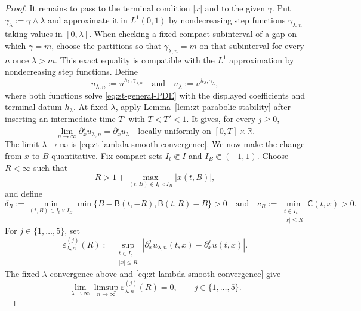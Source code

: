 \documentclass[10pt]{amsart}
\theoremstyle{definition}
\theoremstyle{remark}
\numberwithin{equation}{section}
\newcommand{\R}{\mathbb R}
\newcommand{\1}{\mathbf 1}
\begin{document}
\begin{proof}
It remains to pass to the terminal condition $|x|$ and to the given $\gamma$. Put $\gamma_\lambda:=\gamma\wedge\lambda$ and approximate it in $L^1(0,1)$ by nondecreasing step functions $\gamma_{\lambda,n}$ taking values in $[0,\lambda]$. When checking a fixed compact subinterval of a gap on which $\gamma=m$, choose the partitions so that $\gamma_{\lambda,n}=m$ on that subinterval for every $n$ once $\lambda>m$. This exact equality is compatible with the $L^1$ approximation by nondecreasing step functions. Define
\begin{equation*}
 u_{\lambda,n}:=u^{h_\lambda,\gamma_{\lambda,n}}
 \quad\text{and}\quad
 u_\lambda:=u^{h_\lambda,\gamma_\lambda},
\end{equation*}
where both functions solve \eqref{eq:zt-general-PDE} with the displayed coefficients and terminal datum $h_\lambda$. At fixed $\lambda$, apply Lemma~\ref{lem:zt-parabolic-stability} after inserting an intermediate time $T'$ with $T<T'<1$. It gives, for every $j\geq0$,
\begin{equation*}
 \lim_{n\to\infty}\partial_x^ju_{\lambda,n}=\partial_x^ju_\lambda
 \quad\text{locally uniformly on }[0,T]\times\R.
\end{equation*}
The limit $\lambda\to\infty$ is \eqref{eq:zt-lambda-smooth-convergence}. We now make the change from $x$ to $B$ quantitative. Fix compact sets $I_t\Subset I$ and $I_B\Subset(-1,1)$. Choose $R<\infty$ such that
\begin{equation*}
 R>1+\max_{(t,B)\in I_t\times I_B}|x(t,B)|,
\end{equation*}
and define
\begin{equation*}
 \delta_R:=\min_{(t,B)\in I_t\times I_B}\min\{B-\mathsf B(t,-R),\mathsf B(t,R)-B\}>0
 \quad\text{and}\quad c_R:=\min_{\substack{t\in I_t\\|x|\leq R}}\mathsf C(t,x)>0.
\end{equation*}
For $j\in\{1,\ldots,5\}$, set
\begin{equation*}
 \varepsilon_{\lambda,n}^{(j)}(R):=\sup_{\substack{t\in I_t\\|x|\leq R}}
 |\partial_x^ju_{\lambda,n}(t,x)-\partial_x^ju(t,x)|.
\end{equation*}
The fixed-$\lambda$ convergence above and \eqref{eq:zt-lambda-smooth-convergence} give
\begin{equation}
 \lim_{\lambda\to\infty}\limsup_{n\to\infty}\varepsilon_{\lambda,n}^{(j)}(R)=0,
 \qquad j\in\{1,\ldots,5\}.
 \label{eq:zt-approx-spatial-derivatives}
\end{equation}

\end{proof}
\end{document}
